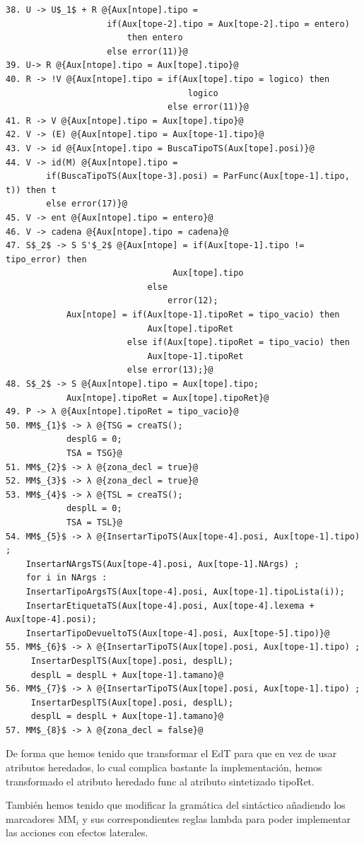 \documentclass[a4paper, 12pt]{article}
\begin{document}
\begin{lstlisting}[style=EdT]
38. U -> U$_1$ + R @{Aux[ntope].tipo = 
					if(Aux[tope-2].tipo = Aux[tope-2].tipo = entero)
						then entero 
					else error(11)}@
39. U-> R @{Aux[ntope].tipo = Aux[tope].tipo}@
40. R -> !V @{Aux[ntope].tipo = if(Aux[tope].tipo = logico) then 
									logico
             					else error(11)}@
41. R -> V @{Aux[ntope].tipo = Aux[tope].tipo}@
42. V -> (E) @{Aux[ntope].tipo = Aux[tope-1].tipo}@
43. V -> id @{Aux[ntope].tipo = BuscaTipoTS(Aux[tope].posi)}@
44. V -> id(M) @{Aux[ntope].tipo = 
		if(BuscaTipoTS(Aux[tope-3].posi) = ParFunc(Aux[tope-1].tipo, t)) then t
		else error(17)}@
45. V -> ent @{Aux[ntope].tipo = entero}@
46. V -> cadena @{Aux[ntope].tipo = cadena}@
47. S$_2$ -> S S'$_2$ @{Aux[ntope] = if(Aux[tope-1].tipo != tipo_error) then
								 Aux[tope].tipo
							else 
								error(12);
			Aux[ntope] = if(Aux[tope-1].tipoRet = tipo_vacio) then 
							Aux[tope].tipoRet
						else if(Aux[tope].tipoRet = tipo_vacio) then 
							Aux[tope-1].tipoRet 
						else error(13);}@
48. S$_2$ -> S @{Aux[ntope].tipo = Aux[tope].tipo;
			Aux[ntope].tipoRet = Aux[tope].tipoRet}@
49. P -> λ @{Aux[ntope].tipoRet = tipo_vacio}@
50. MM$_{1}$ -> λ @{TSG = creaTS();
			desplG = 0;
			TSA = TSG}@
51. MM$_{2}$ -> λ @{zona_decl = true}@
52. MM$_{3}$ -> λ @{zona_decl = true}@
53. MM$_{4}$ -> λ @{TSL = creaTS();
			desplL = 0;
			TSA = TSL}@
54. MM$_{5}$ -> λ @{InsertarTipoTS(Aux[tope-4].posi, Aux[tope-1].tipo) ;
	InsertarNArgsTS(Aux[tope-4].posi, Aux[tope-1].NArgs) ;
	for i in NArgs :
	InsertarTipoArgsTS(Aux[tope-4].posi, Aux[tope-1].tipoLista(i));
	InsertarEtiquetaTS(Aux[tope-4].posi, Aux[tope-4].lexema + Aux[tope-4].posi); 
	InsertarTipoDevueltoTS(Aux[tope-4].posi, Aux[tope-5].tipo)}@
55. MM$_{6}$ -> λ @{InsertarTipoTS(Aux[tope].posi, Aux[tope-1].tipo) ;
     InsertarDesplTS(Aux[tope].posi, desplL);
     desplL = desplL + Aux[tope-1].tamano}@
56. MM$_{7}$ -> λ @{InsertarTipoTS(Aux[tope].posi, Aux[tope-1].tipo) ;
     InsertarDesplTS(Aux[tope].posi, desplL);
     desplL = desplL + Aux[tope-1].tamano}@
57. MM$_{8}$ -> λ @{zona_decl = false}@
\end{lstlisting}
\newpage
De forma que hemos tenido que transformar el EdT para que en vez de usar atributos heredados, lo cual complica bastante la implementación, hemos transformado el atributo heredado func al atributo sintetizado tipoRet.

También hemos tenido que modificar la gramática del sintáctico añadiendo los marcadores MM$_i$ y sus correspondientes reglas lambda para poder implementar las acciones con efectos laterales.
\end{document}

